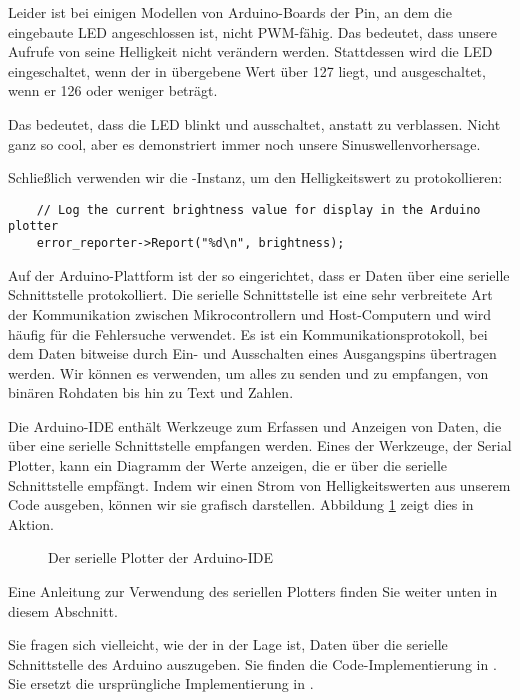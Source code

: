 Leider ist bei einigen Modellen von Arduino-Boards der Pin, an dem die eingebaute LED angeschlossen ist, nicht PWM-fähig. Das bedeutet, dass unsere Aufrufe von  seine Helligkeit nicht verändern werden. Stattdessen wird die LED eingeschaltet, wenn der in  übergebene Wert über 127 liegt, und ausgeschaltet, wenn er 126 oder weniger beträgt.
     
Das bedeutet, dass die LED blinkt und ausschaltet, anstatt zu verblassen. Nicht ganz so cool, aber es demonstriert immer noch unsere Sinuswellenvorhersage.

Schließlich verwenden wir die -Instanz, um den Helligkeitswert zu protokollieren:
     
\begin{lstlisting}
    // Log the current brightness value for display in the Arduino plotter
 	error_reporter->Report("%d\n", brightness);
\end{lstlisting}      
     
Auf der Arduino-Plattform ist der  so eingerichtet, dass er Daten über eine serielle Schnittstelle protokolliert. 	Die serielle Schnittstelle ist eine sehr verbreitete Art der Kommunikation zwischen Mikrocontrollern und Host-Computern und wird häufig für die Fehlersuche verwendet. Es ist ein Kommunikationsprotokoll, bei dem Daten bitweise durch Ein- und Ausschalten eines Ausgangspins übertragen werden. Wir können es verwenden, um alles zu senden und zu empfangen, von binären Rohdaten bis hin zu Text und Zahlen.
     
Die Arduino-IDE enthält Werkzeuge zum Erfassen und Anzeigen von Daten, die über eine serielle Schnittstelle empfangen werden. Eines der Werkzeuge, der Serial Plotter, kann ein Diagramm der Werte anzeigen, die er über die serielle Schnittstelle empfängt. Indem wir einen Strom von Helligkeitswerten aus unserem Code ausgeben, können wir sie grafisch darstellen. Abbildung \ref{fig:SerialPlotter} zeigt dies in Aktion.
 
\begin{figure}
    \centering
    
    \caption{Der serielle Plotter der Arduino-IDE}\label{fig:SerialPlotter}
\end{figure}
 	
 	
Eine Anleitung zur Verwendung des seriellen Plotters finden Sie weiter unten in diesem Abschnitt.
     
     
Sie fragen sich vielleicht, wie der  in der Lage ist, Daten über die serielle Schnittstelle des Arduino auszugeben. Sie finden die Code-Implementierung in . Sie ersetzt die ursprüngliche Implementierung in .

